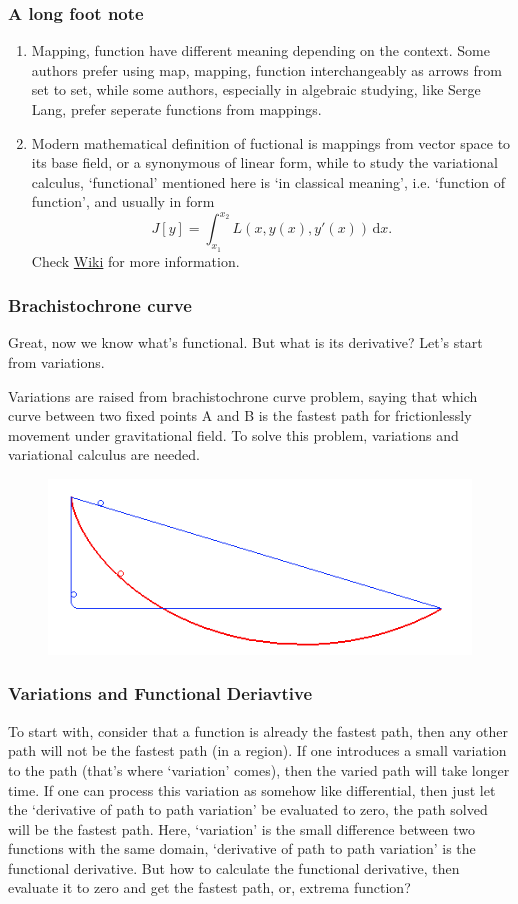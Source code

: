 \documentclass[compress]{beamer}
\begin{document}
\begin{frame}
  \frametitle{A long foot note}
  \begin{enumerate}
    \item Mapping, function have different meaning depending on the context. Some authors prefer using map, mapping, function interchangeably as
          arrows from set to set, while some authors, especially in algebraic studying, like Serge Lang, prefer seperate functions from mappings.
    \item Modern mathematical definition of fuctional is mappings from vector space to its base field,
          or a synonymous of linear form, while to study the variational calculus, `functional' mentioned here is `in classical meaning', i.e. `function of function',
          and  usually in form \[J\left[ y \right]=\int_{x_1}^{x_2}L(x,y(x),y'(x)) \,\mathrm{d}x.\]
          Check \href{https://en.wikipedia.org/wiki/Functional_(mathematics)}{\color{blue}Wiki} for more information.
  \end{enumerate}
\end{frame}

\begin{frame}
  \frametitle{Brachistochrone curve}
  Great, now we know what's functional. But what is its derivative? Let's start from variations.

  Variations are raised from brachistochrone curve problem, saying that which curve between two fixed points A and B is
  the fastest path for frictionlessly movement under gravitational field. To solve this problem, variations and variational calculus are needed.
  \begin{figure}
    \centering
    \includegraphics[width=0.7\linewidth]{pic/Brachistochrone.png}
  \end{figure}
\end{frame}

\begin{frame}
  \frametitle{Variations and Functional Deriavtive}
  To start with, consider that a function is already the fastest path, then any other path will not be the fastest path (in a region). If one introduces a small
  variation to the path (that's where `variation' comes), then the varied path will take longer time. If one can process this variation as somehow like differential,
  then just let the `derivative of path to path variation' be evaluated to zero, the path solved will be the fastest path.
  \bigbreak
  Here, `variation' is the small difference between two functions with the same domain,
  `derivative of path to path variation' is the functional derivative.
  \bigbreak
  But how to calculate the functional derivative, then evaluate it to zero and get the fastest path, or, extrema function?
\end{frame}
\end{document}
